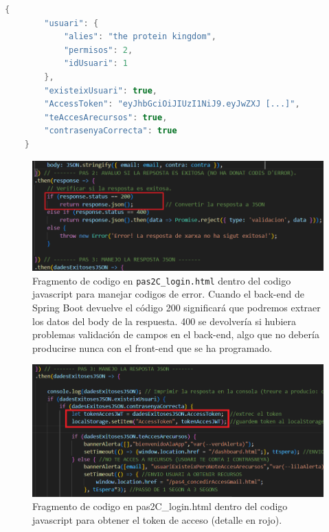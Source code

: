 \documentclass[a4paper,12pt]{report}
\begin{document}
\begin{lstlisting}[language=Java, basicstyle=\ttfamily\footnotesize, keywordstyle=\color{magenta}]
	{
		"usuari": {
			"alies": "the protein kingdom",
			"permisos": 2,
			"idUsuari": 1
		},
		"existeixUsuari": true,
		"AccessToken": "eyJhbGciOiJIUzI1NiJ9.eyJwZXJ [...]",
		"teAccesArecursos": true,
		"contrasenyaCorrecta": true
	}
\end{lstlisting}
	

	
	\setlength{\belowcaptionskip}{3pt}
	\FloatBarrier
	\begin{figure}[H]
		\centering
		\caption{Fragmento de codigo en \texttt{pas2C\_login.html} dentro del codigo javascript para manejar codigos de error. Cuando el back-end de Spring Boot devuelve el código 200 significará que podremos extraer los datos del body de la respuesta. 400 se devolvería si hubiera problemas validación de campos en el back-end,  algo que no debería producirse nunca con el front-end que se ha programado.}
		\includegraphics[width=1\textwidth]{img/FetchCodisResponseFRONT.png}
		
		\label{fig:FetchCodisResponseFRONT} 
	\end{figure}
	\FloatBarrier
	
	\setlength{\belowcaptionskip}{3pt}
	\FloatBarrier
	\begin{figure}[H]
		\centering
		\caption{Fragmento de codigo en pas2C\_login.html dentro del codigo javascript para obtener el token de acceso (detalle en rojo).}
		\includegraphics[width=1\textwidth]{img/jwtFetchLoginFront.png}
		
		\label{fig:figuraLoginFetch} 
	\end{figure}
	\FloatBarrier
	
\end{document}
